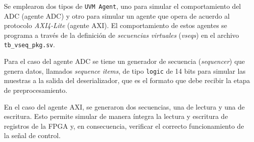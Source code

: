 \documentclass[../../main.tex]{subfiles}
\begin{document}
Se emplearon dos tipos de \texttt{UVM Agent}, uno para simular el comportamiento del ADC (agente ADC) y otro para simular un agente que opera de acuerdo al protocolo \textit{AXI4-Lite}\cite{AXI-4} (agente AXI). El comportamiento de estos agentes se programa a través de la definición de \textit{secuencias virtuales} (\textit{vseqs}) en el archivo \texttt{tb\_vseq\_pkg.sv}.

Para el caso del agente ADC se tiene un generador de secuencia (\textit{sequencer}) que genera datos, llamados \textit{sequence items}, de tipo \texttt{logic} de 14 bits para simular las muestras a la salida del deserializador, que es el formato que debe recibir la etapa de preprocesamiento. 

En el caso del agente AXI, se generaron dos secuencias, una de lectura y una de escritura. Esto permite simular de manera íntegra la lectura y escritura de registros de la FPGA y, en consecuencia, verificar el correcto funcionamiento de la señal de control.

\end{document}
